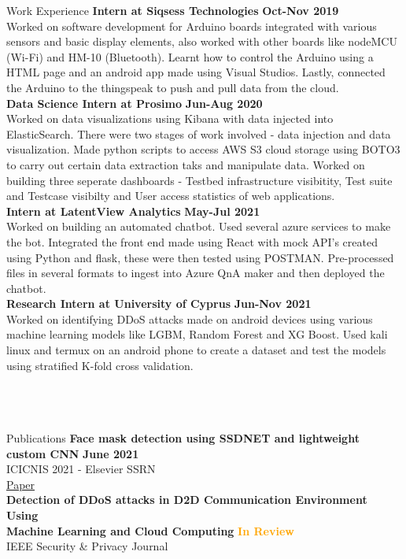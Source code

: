 \documentclass{resume}
\begin{document}
\begin{rSection}{Work Experience}
{\bf Intern at Siqsess Technologies } 
\hfill{\textbf{\textcolor{OliveGreen}{Oct-Nov 2019}}} \\
Worked on software development for Arduino boards integrated with various sensors and basic display elements, also worked with other boards like nodeMCU (Wi-Fi) and HM-10 (Bluetooth). Learnt how to control the Arduino using a HTML page and an android app made using Visual Studios. Lastly,  connected the Arduino to the thingspeak to push and pull data from the cloud.\\
{\bf Data Science Intern at Prosimo} 
\hfill{\textbf{\textcolor{OliveGreen}{Jun-Aug 2020}}} \\
Worked on data visualizations using Kibana with data injected into ElasticSearch. There were two stages of work involved - data injection and data visualization. Made python scripts to access AWS S3 cloud storage using BOTO3 to carry out certain data extraction taks and manipulate data. Worked on building three seperate dashboards - Testbed infrastructure visibitity, Test suite and Testcase visibilty and User access statistics of web applications.\\
{\bf Intern at LatentView Analytics} 
\hfill{\textbf{\textcolor{OliveGreen}{May-Jul 2021}}} \\
Worked on building an automated chatbot. Used several azure services to make the bot. Integrated the front end  made using React with mock API's created using Python and flask, these were then tested using POSTMAN. Pre-processed files in several formats to ingest into Azure QnA maker and then deployed the chatbot.  \\
{\bf Research Intern at University of Cyprus} 
\hfill{\textbf{\textcolor{OliveGreen}{Jun-Nov 2021}}} \\
Worked on identifying DDoS attacks made on android devices using various machine learning models like LGBM, Random Forest and XG Boost. Used kali linux and termux on an android phone to create a dataset and test the models using stratified K-fold cross validation. \\\\\\\\
\end{rSection}
\begin{rSection}{Publications}
{\bf Face mask detection using SSDNET and lightweight custom CNN}
\hfill{\textbf{\textcolor{OliveGreen}{June 2021}}}\\
ICICNIS 2021 - Elsevier SSRN\\
\href{https://papers.ssrn.com/sol3/papers.cfm?abstract_id=3882472}{Paper}\\
{\bf Detection of DDoS attacks in D2D Communication Environment Using\\ Machine Learning and Cloud Computing}
\hfill{\textbf{\textcolor{Orange}{In Review}}}\\
IEEE Security \& Privacy Journal
\end{rSection}
\end{document}
